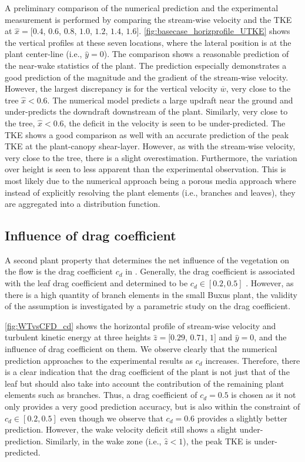 A preliminary comparison of the numerical prediction and the experimental measurement is performed by comparing the stream-wise velocity and the TKE at $\hat{x} = [0.4$, $0.6$, $0.8$, $1.0$, $1.2$, $1.4$, $1.6]$. \cref{fig:basecase_horizprofile_UTKE} shows the vertical profiles at these seven locations, where the lateral position is at the plant center-line (i.e., $\hat{y} = 0$).  The comparison shows a reasonable prediction of the near-wake statistics of the plant. The prediction especially demonstrates a good prediction of the magnitude and the gradient of the stream-wise velocity. However, the largest discrepancy is for the vertical velocity $\overline{w}$, very close to the tree $\hat{x} < 0.6$. The numerical model predicts a large updraft near the ground and under-predicts the downdraft downstream of the plant. Similarly, very close to the tree, $\hat{x} < 0.6$, the deficit in the velocity is seen to be under-predicted. The TKE shows a good comparison as well with an accurate prediction of the peak TKE at the plant-canopy shear-layer. However, as with the stream-wise velocity, very close to the tree, there is a slight overestimation. Furthermore, the variation over height is seen to less apparent than the experimental observation. This is most likely due to the numerical approach being a porous media approach where instead of explicitly resolving the plant elements (i.e., branches and leaves), they are aggregated into a distribution function.

\subsection{Influence of drag coefficient}
\label{subsec:dragcoeff}
A second plant property that determines the net influence of the vegetation on the flow is the drag coefficient $c_d$ in . Generally, the drag coefficient is associated with the leaf drag coefficient and determined to be  $c_d \in [0.2, 0.5]$ \citep{Vogel1989,Wilson1977}. However, as there is a high quantity of branch elements in the small Buxus plant, the validity of the assumption is investigated by a parametric study on the drag coefficient.

\cref{fig:WTvsCFD_cd} shows the horizontal profile of  stream-wise velocity and turbulent kinetic energy at three heights $\hat{z} = [0.29$, $0.71$, $1]$ and $\hat{y}=0$, and the influence of drag coefficient on them. We observe clearly that the numerical prediction approaches to the experimental results as $c_d$ increases. Therefore, there is a clear indication that the drag coefficient of the plant is not just that of the leaf but should also take into account the contribution of the remaining plant elements such as branches. Thus, a drag coefficient of $c_d = 0.5$ is chosen as it not only provides a very good prediction accuracy, but is also within the constraint of  $c_d \in [0.2, 0.5]$ \citep{Vogel1989,Wilson1977} even though we observe that $c_d=0.6$ provides a slightly better prediction. However, the wake velocity deficit still shows a slight under-prediction. Similarly, in the wake zone (i.e., $\hat{z} < 1$), the peak TKE is under-predicted. 

